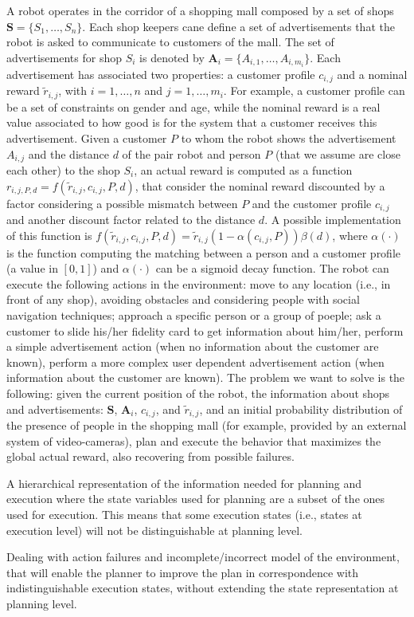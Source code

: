 A robot operates in the corridor of a shopping mall composed by a set of shops ${\mathbf S} = \{ S_1, \ldots, S_n \}$. Each shop keepers cane define a set of advertisements that the robot is asked to communicate to customers of the mall. The set of advertisements for shop $S_i$ is denoted by ${\mathbf A}_i = \{ A_{i,1}, \ldots, A_{i,m_i} \}$. Each advertisement has associated two properties: a customer profile $c_{i,j}$ and a nominal reward $\tilde r_{i,j}$, with $i=1, \ldots, n$ and $j=1, \ldots, m_i$. For example, a customer profile can be a set of constraints on gender and age, while the nominal reward is a real value associated to how good is for the system that a customer receives this advertisement.
Given a customer $P$ to whom the robot shows the advertisement $A_{i,j}$ and the distance $d$ of the pair robot and person $P$ (that we assume are close each other) to the shop $S_i$, an actual reward is computed as a function $r_{i,j,P,d} = f({\tilde r}_{i,j},c_{i,j},P,d)$, that consider the nominal reward discounted by a factor considering a possible mismatch between $P$ and the customer profile $c_{i,j}$ and another discount factor related to the distance $d$. A possible implementation of this function is $ f({\tilde r}_{i,j},c_{i,j},P,d) =
{\tilde r}_{i,j} (1 - \alpha(c_{i,j},P)) \beta (d)$, where $\alpha(\cdot)$ is the function computing the matching between a person and a customer profile (a value in $[0,1]$)
and  $\alpha(\cdot)$ can be a sigmoid decay function.
The robot can execute the following actions in the environment: move to any location (i.e., in front of any shop), avoiding obstacles and considering people with social navigation techniques; approach a specific person or a group of poeple; ask a customer to slide his/her fidelity card to get information about him/her, perform a simple advertisement action (when no information about the customer are known), perform a more complex user dependent advertisement action (when information about the customer are known).
The problem we want to solve is the following: given the current position of the robot,
the information about shops and advertisements: ${\mathbf S}$, ${\mathbf A}_i$, $c_{i,j}$, and  $\tilde r_{i,j}$, and an initial probability distribution of the presence of people in the shopping mall (for example, provided by an external system of video-cameras), plan and execute the behavior that maximizes the global actual reward, also recovering from possible failures.




A hierarchical representation of the information needed for planning and execution where the state variables used for planning are a subset of the ones used for execution. This means that some execution states (i.e., states at execution level) will not be distinguishable at planning level.


Dealing with action failures and incomplete/incorrect model of the environment, that will enable the planner to improve the plan in correspondence with indistinguishable execution states, without extending the state representation at planning level.






